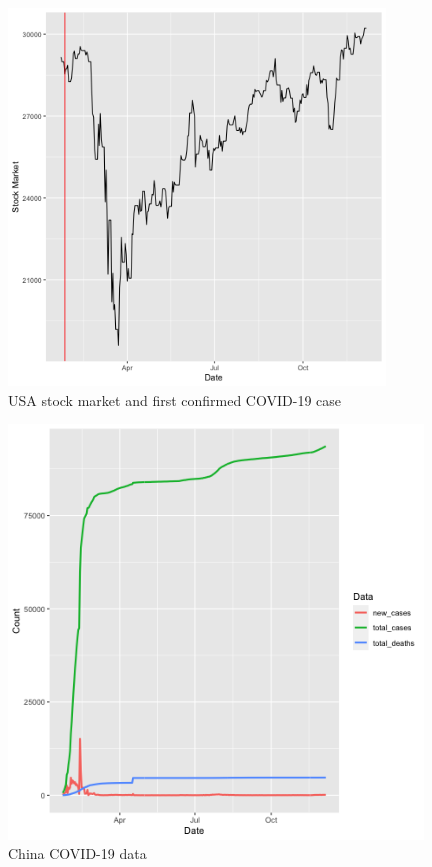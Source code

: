 \documentclass[11pt]{article}
\begin{document}
\begin{figure}[!h]
\centering
  \includegraphics[width=100mm]{R-Code/plots/usaFinance.png} 
    \caption{USA stock market and first confirmed COVID-19 case}
    \label{usa-covid-market}
\end{figure}

\begin{figure}[h!]
\centering
  \includegraphics[width=110mm]{R-Code/plots/chinaCovid.png} 
  \caption{China COVID-19 data}
\end{figure}
\end{document}
